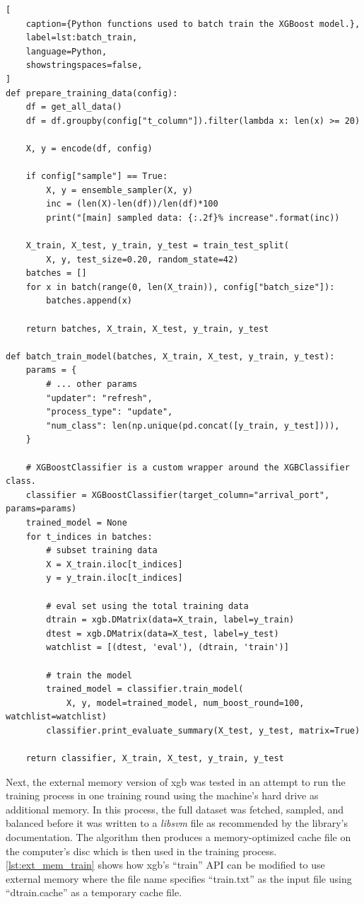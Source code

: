 \begin{lstlisting}[
    caption={Python functions used to batch train the XGBoost model.},
    label=lst:batch_train,
    language=Python,
    showstringspaces=false,
]
def prepare_training_data(config):
    df = get_all_data()
    df = df.groupby(config["t_column"]).filter(lambda x: len(x) >= 20)

    X, y = encode(df, config)

    if config["sample"] == True:
        X, y = ensemble_sampler(X, y)
        inc = (len(X)-len(df))/len(df)*100
        print("[main] sampled data: {:.2f}% increase".format(inc))

    X_train, X_test, y_train, y_test = train_test_split(
        X, y, test_size=0.20, random_state=42)
    batches = []
    for x in batch(range(0, len(X_train)), config["batch_size"]):
        batches.append(x)

    return batches, X_train, X_test, y_train, y_test

def batch_train_model(batches, X_train, X_test, y_train, y_test):
    params = {
        # ... other params
        "updater": "refresh",
        "process_type": "update",
        "num_class": len(np.unique(pd.concat([y_train, y_test]))),
    }

    # XGBoostClassifier is a custom wrapper around the XGBClassifier class.
    classifier = XGBoostClassifier(target_column="arrival_port", params=params)
    trained_model = None
    for t_indices in batches:
        # subset training data
        X = X_train.iloc[t_indices]
        y = y_train.iloc[t_indices]

        # eval set using the total training data
        dtrain = xgb.DMatrix(data=X_train, label=y_train)
        dtest = xgb.DMatrix(data=X_test, label=y_test)
        watchlist = [(dtest, 'eval'), (dtrain, 'train')]

        # train the model
        trained_model = classifier.train_model(
            X, y, model=trained_model, num_boost_round=100, watchlist=watchlist)
        classifier.print_evaluate_summary(X_test, y_test, matrix=True)

    return classifier, X_train, X_test, y_train, y_test
\end{lstlisting}


Next, the external memory version of \acrshort{xgb} was tested in an attempt to run the training process in one training round using the machine's hard drive as additional memory. In this process, the full dataset was fetched, sampled, and balanced before it was written to a \textit{libsvm} file as recommended by the library's documentation. The algorithm then produces a memory-optimized cache file on the computer's disc which is then used in the training process. \cref{lst:ext_mem_train} shows how \acrshort{xgb}'s ``train'' API can be modified to use external memory where the file name specifies ``train.txt'' as the input file using ``dtrain.cache'' as a temporary cache file.

